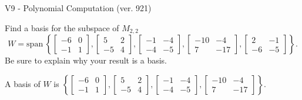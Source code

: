 \begin{exercise}
  \begin{exerciseTitle}V9 - Polynomial Computation (ver. 921)\end{exerciseTitle}
  \begin{exerciseStatement}
    Find a basis for the subspace of \(M_{2,2}\) 
\[W=\mathrm{span}\ \left\{\left[\begin{array}{cc}
-6 & 0 \\
-1 & 1
\end{array}\right] , \left[\begin{array}{cc}
5 & 2 \\
-5 & 4
\end{array}\right] , \left[\begin{array}{cc}
-1 & -4 \\
-4 & -5
\end{array}\right] , \left[\begin{array}{cc}
-10 & -4 \\
7 & -17
\end{array}\right] , \left[\begin{array}{cc}
2 & -1 \\
-6 & -5
\end{array}\right]\right\}.\]
 Be sure to explain why your result is a basis.


  \end{exerciseStatement}
  \begin{exerciseAnswer}
   A basis of \(W\) is  \(\left\{\left[\begin{array}{cc}
-6 & 0 \\
-1 & 1
\end{array}\right] , \left[\begin{array}{cc}
5 & 2 \\
-5 & 4
\end{array}\right] , \left[\begin{array}{cc}
-1 & -4 \\
-4 & -5
\end{array}\right] , \left[\begin{array}{cc}
-10 & -4 \\
7 & -17
\end{array}\right]\right\}\).
  


  \end{exerciseAnswer}
\end{exercise}